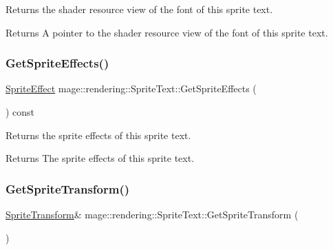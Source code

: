 Returns the shader resource view of the font of this sprite text.

\begin{DoxyReturn}{Returns}
A pointer to the shader resource view of the font of this sprite text. 
\end{DoxyReturn}
\mbox{\label{classmage_1_1rendering_1_1_sprite_text_ad9a7ac6ba55ae87a1849b3f1e8e6892b}} 
\subsubsection{\texorpdfstring{Get\+Sprite\+Effects()}{GetSpriteEffects()}}
{\footnotesize\ttfamily \mbox{\hyperlink{namespacemage_1_1rendering_a4dbc3536c87b906f1d41d863ec458e78}{Sprite\+Effect}} mage\+::rendering\+::\+Sprite\+Text\+::\+Get\+Sprite\+Effects (\begin{DoxyParamCaption}{ }\end{DoxyParamCaption}) const\hspace{0.3cm}{\ttfamily [noexcept]}}

Returns the sprite effects of this sprite text.

\begin{DoxyReturn}{Returns}
The sprite effects of this sprite text. 
\end{DoxyReturn}
\mbox{\label{classmage_1_1rendering_1_1_sprite_text_aab167f1dd0af96e05c34bb631d85e197}} 
\subsubsection{\texorpdfstring{Get\+Sprite\+Transform()}{GetSpriteTransform()}\hspace{0.1cm}{\footnotesize\ttfamily [1/2]}}
{\footnotesize\ttfamily \mbox{\hyperlink{classmage_1_1_sprite_transform}{Sprite\+Transform}}\& mage\+::rendering\+::\+Sprite\+Text\+::\+Get\+Sprite\+Transform (\begin{DoxyParamCaption}{ }\end{DoxyParamCaption})\hspace{0.3cm}{\ttfamily [noexcept]}}

